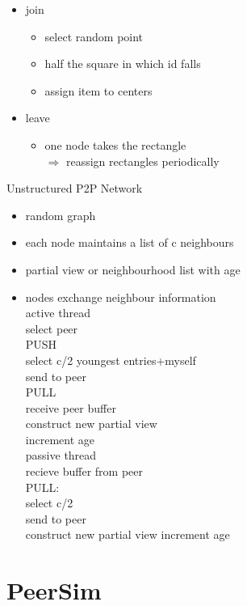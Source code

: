 \documentclass[ngerman,a4paper]{report}
\begin{document}
\begin{enumerate}
\begin{itemize}
\item join\begin{itemize}
\item select random point
\item half the square in which id falls
\item assign item to centers
\end{itemize}
\item leave\begin{itemize}
\item one node takes the rectangle\\
$\Rightarrow$ reassign rectangles periodically
\end{itemize}
\end{itemize}

Unstructured P2P Network\\
\begin{itemize}
\item random graph
\item each node maintains a list of c neighbours
\item partial view or neighbourhood list  with age
\item nodes exchange neighbour information \\active thread\\ select peer\\

PUSH\\
select c/2 youngest entries+myself\\
send to peer\\

PULL\\
receive peer buffer\\
construct new partial view\\
increment age\\

passive thread\\
recieve buffer from peer\\

PULL:\\
select c/2\\
send to peer\\
construct new partial view
increment age\\

\end{itemize}

\end{enumerate}


\section{PeerSim}
\end{document}
